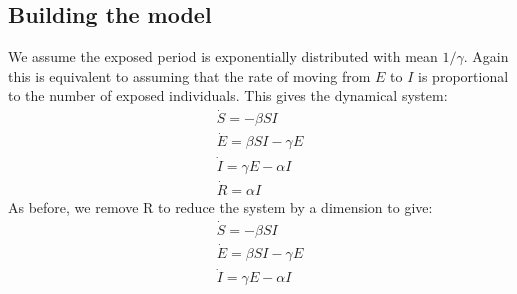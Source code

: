 \subsection{Building the model}
We assume the exposed period is exponentially distributed with mean $1/\gamma$. Again this is equivalent to assuming that the rate of moving from $E$ to $I$ is proportional to the number of exposed individuals. This gives the dynamical system:\\
\begin{eqnarray}
\dot S=-\beta S I\\
\dot E=\beta S I-\gamma E\\
\dot I=\gamma E-\alpha I\\
\dot R=\alpha I
\end{eqnarray}
As before, we remove R to reduce the system by a dimension to give:\label{mmd}\\
\begin{eqnarray}
\dot S=-\beta S I\label{SEIR1}\\
\dot E=\beta S I-\gamma E\label{SEIR2}\\
\dot I=\gamma E-\alpha I\label{SEIR3}
\end{eqnarray}

